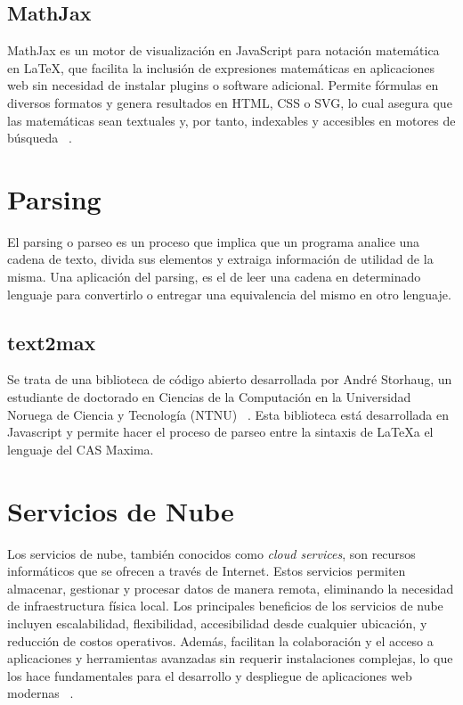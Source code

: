 \subsection{MathJax}
MathJax es un motor de visualización en JavaScript para notación matemática en LaTeX, que facilita la inclusión de expresiones matemáticas en aplicaciones web sin necesidad de instalar plugins o software adicional. Permite fórmulas en diversos formatos y genera resultados en HTML, CSS o SVG, lo cual asegura que las matemáticas sean textuales y, por tanto, indexables y accesibles en motores de búsqueda ~\cite{mathjax}.

\section{Parsing}
El parsing o parseo es un proceso que implica que un programa analice una cadena de texto, divida sus elementos y extraiga información de utilidad de la misma. Una aplicación del parsing, es el de leer una cadena en determinado lenguaje para convertirlo o entregar una equivalencia del mismo en otro lenguaje.

\subsection{text2max}
Se trata de una biblioteca de código abierto desarrollada por André Storhaug, un estudiante de doctorado en Ciencias de la Computación en la Universidad Noruega de Ciencia y Tecnología (NTNU) ~\cite{Parser-tex2maxima}. Esta biblioteca está desarrollada en Javascript y permite hacer el proceso de parseo entre la sintaxis de \LaTeX a el lenguaje del CAS Maxima.

\section{Servicios de Nube}
Los servicios de nube, también conocidos como \textit{cloud services}, son recursos informáticos que se ofrecen a través de Internet. Estos servicios permiten almacenar, gestionar y procesar datos de manera remota, eliminando la necesidad de infraestructura física local. Los principales beneficios de los servicios de nube incluyen escalabilidad, flexibilidad, accesibilidad desde cualquier ubicación, y reducción de costos operativos. Además, facilitan la colaboración y el acceso a aplicaciones y herramientas avanzadas sin requerir instalaciones complejas, lo que los hace fundamentales para el desarrollo y despliegue de aplicaciones web modernas ~\cite{microsoft_azure}.

